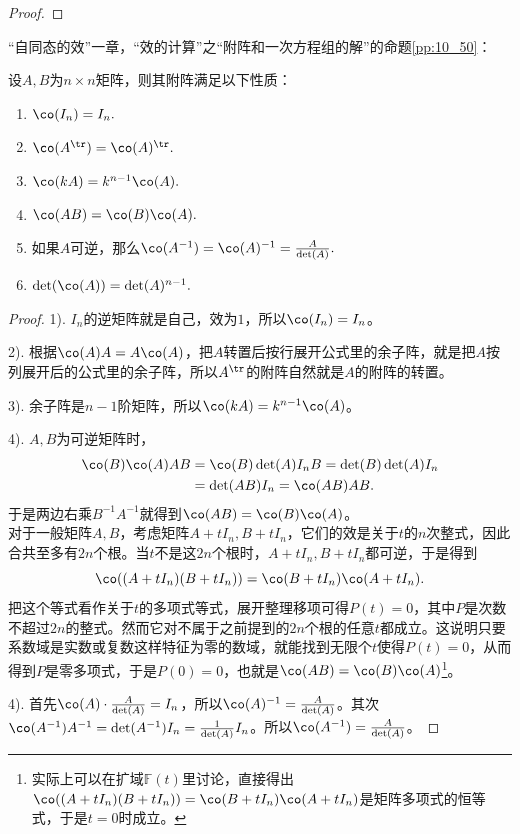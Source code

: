 \documentclass[12pt,UTF8,fontset=none]{ctexbook}
\begin{document}
\begin{appendix}
\begin{proof}
\end{proof}

“自同态的效”一章，“效的计算”之“附阵和一次方程组的解”的命题\ref{pp:10_50}：
\begin{pp}\label{c-25}
    设$A,B$为$n\times n$矩阵，则其附阵满足以下性质：
    \begin{enumerate}
    \item $\co(I_n) = I_n.$
    \item $\co(A^{\tr}) = \co(A)^{\tr}.$
    \item $\co(kA) = k^{n-1}\co(A).$
    \item $\co(AB) = \co(B)\co(A). $
    \item 如果$A$可逆，那么$\co(A^{-1}) = \co(A)^{-1} = \frac{A}{\det(A)}.$
    \item $\det(\co(A)) = \det(A)^{n-1}.$
\end{enumerate}
\end{pp}
\begin{proof}
    1). $I_n$的逆矩阵就是自己，效为$1$，所以$\co(I_n) = I_n$。

    2). 根据$\co(A)A = A\co(A)$，把$A$转置后按行展开公式里的余子阵，就是把$A$按列展开后的公式里的余子阵，所以$A^{\tr}$的附阵自然就是$A$的附阵的转置。

    3). 余子阵是$n-1$阶矩阵，所以$\co(kA) = k^{n-1}\co(A)$。

    4). $A,B$为可逆矩阵时，
    \begin{align*}
        \co(B)\co(A)AB &= \co(B)\det(A)I_nB = \det(B)\det(A)I_n \\
        &= \det(AB)I_n = \co(AB)AB.
    \end{align*}
    于是两边右乘$B^{-1}A^{-1}$就得到$\co(AB) = \co(B)\co(A)$。\\
    对于一般矩阵$A,B$，考虑矩阵$A+tI_n, B+tI_n$，它们的效是关于$t$的$n$次整式，因此合共至多有$2n$个根。当$t$不是这$2n$个根时，$A+tI_n, B+tI_n$都可逆，于是得到
    $$\co((A+tI_n)(B+tI_n)) = \co(B+tI_n)\co(A+tI_n).$$
    把这个等式看作关于$t$的多项式等式，展开整理移项可得$P(t) = 0$，其中$P$是次数不超过$2n$的整式。然而它对不属于之前提到的$2n$个根的任意$t$都成立。这说明只要系数域是实数或复数这样特征为零的数域，就能找到无限个$t$使得$P(t)=0$，从而得到$P$是零多项式，于是$P(0) = 0$，也就是$\co(AB) = \co(B)\co(A)$\footnote{实际上可以在扩域$\mathbb{F}(t)$里讨论，直接得出$\co((A+tI_n)(B+tI_n)) = \co(B+tI_n)\co(A+tI_n)$是矩阵多项式的恒等式，于是$t=0$时成立。}。

    4). 首先$\co(A)\cdot\frac{A}{\det(A)} = I_n$，所以$\co(A)^{-1} = \frac{A}{\det(A)}$。其次$\co(A^{-1})A^{-1} = \det(A^{-1})I_n = \frac{1}{\det(A)}I_n$。所以$\co(A^{-1}) = \frac{A}{\det(A)}$。


\end{proof}
\end{appendix}
\end{document}
